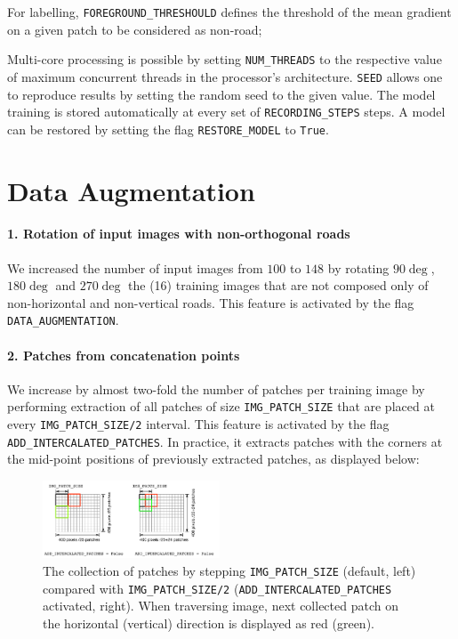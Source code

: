 \documentclass[fleqn,9 pt]{SelfArx} %
\begin{document}
\begin{sloppypar}
For labelling, \texttt{FOREGROUND\_THRESHOULD} defines the threshold of the mean gradient on a given patch to be considered as non-road;

Multi-core processing is possible by setting \texttt{NUM\_THREADS} to the respective value of maximum concurrent threads in the processor's architecture. \texttt{SEED} allows one to reproduce results by setting the random seed to the given value. The model training is stored automatically at every set of \texttt{RECORDING\_STEPS} steps. A model can be restored by setting the flag \texttt{RESTORE\_MODEL} to \texttt{True}.

\section{Data Augmentation}
\label{sec-data-augmentation}

\paragraph{1. Rotation of input images with non-orthogonal roads} We increased the number of input images from $100$ to $148$ by rotating $90 \deg$, $180 \deg$ and $270 \deg$ the (16) training images that are not composed only of non-horizontal and non-vertical roads. This feature is activated by the flag \texttt{DATA\_AUGMENTATION}.

\paragraph{2. Patches from concatenation points} We increase by almost two-fold the number of patches per training image by performing extraction of all patches of size \texttt{IMG\_PATCH\_SIZE} that are placed at every \texttt{IMG\_PATCH\_SIZE/2} interval. This feature is activated by the flag \texttt{ADD\_INTERCALATED\_PATCHES}. In practice, it extracts patches with the corners at the mid-point positions of previously extracted patches, as displayed below:

\begin{figure}[H]
\centering
\includegraphics[width=0.47\textwidth]{figures/ADD_INTERCALATED_PATCHES.pdf}
\caption{\small The collection of patches by stepping \texttt{IMG\_PATCH\_SIZE} (default, left) compared with \texttt{IMG\_PATCH\_SIZE/2} (\texttt{ADD\_INTERCALATED\_PATCHES} activated, right). When traversing image, next collected patch on the horizontal (vertical) direction is displayed as red (green).}
\end{figure}


\end{sloppypar}
\end{document}
